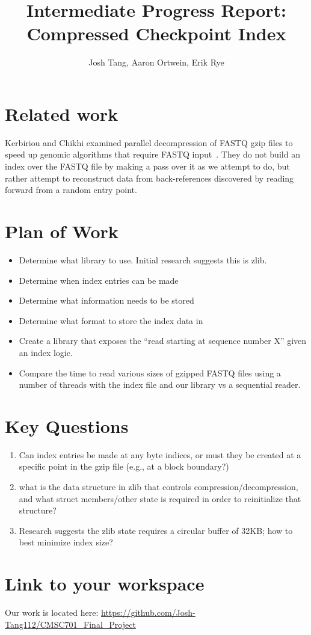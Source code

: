 \documentclass[10pt]{article}
\title{Intermediate Progress Report:\\ Compressed Checkpoint Index}
\author{Josh Tang, Aaron Ortwein, Erik Rye}
\begin{document}
\maketitle
\section{Related work}

Kerbiriou and Chikhi examined parallel decompression of FASTQ gzip files to
speed up genomic algorithms that require FASTQ
input~\cite{kerbiriou2019parallel}. They do not build an index over the FASTQ
file by making a pass over it as we attempt to do, but rather attempt to
reconstruct data from back-references discovered by reading forward from a
random entry point.

\section{Plan of Work}

\begin{itemize}

\item Determine what library to use. Initial research suggests this is zlib.
\item Determine when index entries can be made 
\item Determine what information needs to be stored 
\item Determine what format to store the index data in 
\item Create a library that exposes the ``read starting at sequence number
        X'' given an index logic.
\item Compare the time to read various sizes of gzipped FASTQ files using a
    number of threads with the index file and our library vs a sequential
        reader.
\end{itemize}

\section{Key Questions}

\begin{enumerate}
\item Can index entries be made at any  byte indices, or must they be created at
    a specific point in the gzip file (e.g., at a block boundary?)
\item what is the data structure in zlib that controls
    compression/decompression, and what struct members/other state is required
        in order to reinitialize that structure?
\item Research suggests the zlib state requires a circular buffer of 32KB; how
    to best minimize index size?
\end{enumerate}

\section{Link to your workspace}

Our work is located here:
\url{https://github.com/Josh-Tang112/CMSC701_Final_Project}



\end{document}
